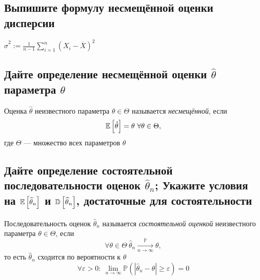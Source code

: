 \documentclass{article}
\begin{document}

\subsection{Выпишите формулу несмещённой оценки дисперсии}
 $\widehat{\sigma}^2:=\displaystyle\frac{1}{n-1}\sum_{i=1}^n (X_i-\overline{X})^2$


\subsection{Дайте определение несмещённой оценки $\widehat{\theta}$ параметра $\theta$}
 Оценка $\hat{\theta}$ неизвестного параметра $\theta\in\Theta$ называется \textit{несмещённой}, если 
\begin{equation*}
    \matwait{\hat{\theta}}=\theta\ \forall\theta\in\Theta,
\end{equation*}
где $\Theta$ — множество всех параметров $\theta$

\subsection{Дайте определение состоятельной последовательности оценок $\widehat{\theta}_n$; Укажите условия на $\mathbb{E}\left[\widehat{\theta}_n\right]$ и $\mathbb{D}\left[\widehat{\theta}_n\right]$, достаточные для состоятельности}
 Последовательность оценок $\hat{\theta}_n$ называется \textit{состоятельной оценкой} неизвестного параметра $\theta\in\Theta$, если
\begin{equation*}
    \forall \theta\in\Theta\ \hat{\theta}_n\underset{n\to\infty}{\overset{\mathbb{P}}{\longrightarrow}}\theta,
\end{equation*}
то есть $\hat{\theta}_n$ сходится по вероятности к $\theta$
\begin{equation*}
    \forall\varepsilon>0:\ \lim\limits_{n\to\infty}\mathbb{P}(|\hat{\theta}_n-\theta|\geqslant\varepsilon)=0
\end{equation*}
\end{document}
